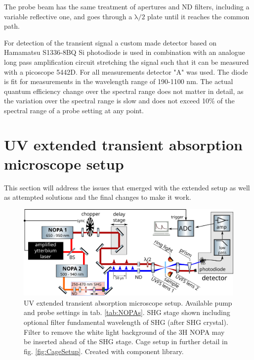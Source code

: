 \documentclass[twoside,openright,listof=numbered]{scrreprt}
\begin{document}
The probe beam has the same treatment of apertures and ND filters, including a variable reflective one, and goes through a $\mathrm{\lambda/2}$ plate until it reaches the common path.


For detection of the transient signal a custom made detector based on Hamamatsu S1336-8BQ Si photodiode is used in combination with an analogue long pass amplification circuit stretching the signal such that it can be measured with a picoscope 5442D. For all measurements detector "A" was used. The diode is fit for measurements in the wavelength range of 190-1100 nm. The actual quantum efficiency change over the spectral range does not matter in detail, as the variation over the spectral range is slow and does not exceed 10\% of the spectral range of a probe setting at any point.

\section{UV extended transient absorption microscope setup}
This section will address the issues that emerged with the extended setup as well as attempted solutions and the final changes to make it work.

\begin{figure}[h]
\centering
\includegraphics[width=0.9\linewidth]{images/ComponentLibrary_svg/experimental_tam_shg_swapped.png}
\caption[UV extended transient absorption microscope setup.]{UV extended transient absorption microscope setup. Available pump and probe settings in tab. \ref{tab:NOPAs}.
SHG stage shown including optional filter fundamental wavelength of SHG (after SHG crystal). Filter to remove the white light background of the 3H NOPA may be inserted ahead of the SHG stage. Cage setup in further detail in fig. \ref{fig:CageSetup}. Created with component library.}
\end{figure}
\end{document}
